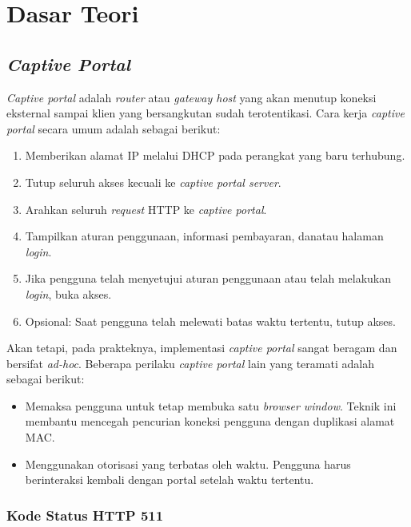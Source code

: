\chapter{Dasar Teori}
\label{chap:dasar_teori}



\section{\textit{Captive Portal}}
\label{sec:captive_portal}

\textit{Captive portal} adalah \textit{router} atau \textit{gateway host} yang akan menutup koneksi eksternal sampai klien yang bersangkutan sudah terotentikasi\cite{Potter:2002}. Cara kerja \textit{captive portal} secara umum adalah sebagai berikut\cite{Potter:2002}:

\begin{enumerate}
    \item{Memberikan alamat IP melalui DHCP pada perangkat yang baru terhubung.}
    \item{Tutup seluruh akses kecuali ke \textit{captive portal server}.}
    \item{Arahkan seluruh \textit{request} HTTP ke \textit{captive portal}.}
    \item{Tampilkan aturan penggunaan, informasi pembayaran, dan\/atau halaman \textit{login}.}
    \item{Jika pengguna telah menyetujui aturan penggunaan atau telah melakukan \textit{login}, buka akses.}
    \item{Opsional: Saat pengguna telah melewati batas waktu tertentu, tutup akses.}
\end{enumerate}

Akan tetapi, pada prakteknya, implementasi \textit{captive portal} sangat beragam dan bersifat \textit{ad-hoc}\cite{HTTPWG_CP:2016}. Beberapa perilaku \textit{captive portal} lain yang teramati adalah sebagai berikut\cite{HTTPWG_CP:2016}:

\begin{itemize}
    \item{Memaksa pengguna untuk tetap membuka satu \textit{browser window}. Teknik ini membantu mencegah pencurian koneksi pengguna dengan duplikasi alamat MAC.}
    \item{Menggunakan otorisasi yang terbatas oleh waktu. Pengguna harus berinteraksi kembali dengan portal setelah waktu tertentu.}
\end{itemize}

\subsection{Kode Status HTTP 511}
\label{subsec:http_511}

